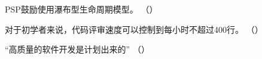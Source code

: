 \begin{problem}
	PSP鼓励使用瀑布型生命周期模型。
	\hfill （）
\end{problem}



\begin{problem}
	对于初学者来说，代码评审速度可以控制到每小时不超过400行。
    \hfill （）
\end{problem}



\begin{problem}
    ‍“高质量的软件开发是计划出来的”
    \hfill （）
\end{problem}

